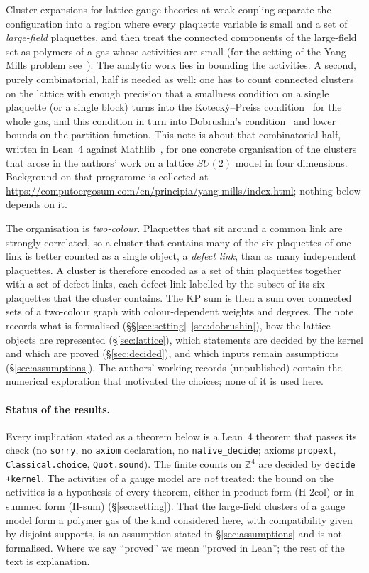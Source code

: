 \documentclass[11pt,a4paper]{article}
\theoremstyle{definition}
\theoremstyle{remark}
\newcommand{\Z}{\mathbb{Z}}
\begin{document}
Cluster expansions for lattice gauge theories at weak coupling separate the configuration into a region where every plaquette variable is small and a set of \emph{large-field} plaquettes, and then treat the connected components of the large-field set as polymers of a gas whose activities are small (for the setting of the Yang--Mills problem see~\cite{JW}). The analytic work lies in bounding the activities. A second, purely combinatorial, half is needed as well: one has to count connected clusters on the lattice with enough precision that a smallness condition on a single plaquette (or a single block) turns into the Kotecký--Preiss condition~\cite{KP} for the whole gas, and this condition in turn into Dobrushin's condition~\cite{Do} and lower bounds on the partition function. This note is about that combinatorial half, written in Lean~4 against Mathlib~\cite{Mathlib}, for one concrete organisation of the clusters that arose in the authors' work on a lattice $SU(2)$ model in four dimensions. Background on that programme is collected at \url{https://computoergosum.com/en/principia/yang-mills/index.html}; nothing below depends on it.

The organisation is \emph{two-colour}. Plaquettes that sit around a common link are strongly correlated, so a cluster that contains many of the six plaquettes of one link is better counted as a single object, a \emph{defect link}, than as many independent plaquettes. A cluster is therefore encoded as a set of thin plaquettes together with a set of defect links, each defect link labelled by the subset of its six plaquettes that the cluster contains. The KP sum is then a sum over connected sets of a two-colour graph with colour-dependent weights and degrees. The note records what is formalised (\S\S\ref{sec:setting}--\ref{sec:dobrushin}), how the lattice objects are represented (\S\ref{sec:lattice}), which statements are decided by the kernel and which are proved (\S\ref{sec:decided}), and which inputs remain assumptions (\S\ref{sec:assumptions}). The authors' working records (unpublished) contain the numerical exploration that motivated the choices; none of it is used here.

\paragraph{Status of the results.} Every implication stated as a theorem below is a Lean~4 theorem that passes its check (no \texttt{sorry}, no \texttt{axiom} declaration, no \texttt{native\_decide}; axioms \texttt{propext}, \texttt{Classical.choice}, \texttt{Quot.sound}). The finite counts on $\Z^4$ are decided by \texttt{decide +kernel}. The activities of a gauge model are \emph{not} treated: the bound on the activities is a hypothesis of every theorem, either in product form (H-2col) or in summed form (H-sum) (\S\ref{sec:setting}). That the large-field clusters of a gauge model form a polymer gas of the kind considered here, with compatibility given by disjoint supports, is an assumption stated in \S\ref{sec:assumptions} and is not formalised. Where we say ``proved'' we mean ``proved in Lean''; the rest of the text is explanation.
\end{document}
